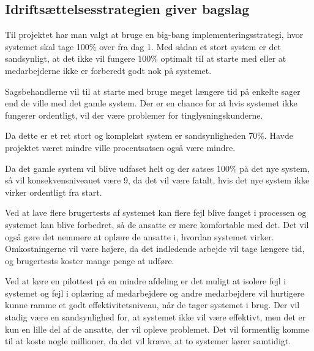 \documentclass[10pt,a4paper,danish]{article}
\begin{document}






\subsection{Idriftsættelsesstrategien giver bagslag}
Til projektet har man valgt at bruge en big-bang implementeringsstrategi, hvor systemet skal tage 100\% over fra dag 1.
Med sådan et stort system er det sandsynligt, at det ikke vil fungere 100\% optimalt til at starte med eller at medarbejderne ikke er forberedt godt nok på systemet. 

Sagsbehandlerne vil til at starte med bruge meget længere tid på enkelte sager end de ville med det gamle system. Der er en chance for at hvis systemet ikke fungerer ordentligt, vil der være problemer for tinglysningskunderne.

Da dette er et ret stort og komplekst system er sandsynligheden 70\%. Havde projektet været mindre ville procentsatsen også være mindre.

Da det gamle system vil blive udfaset helt og der satses 100\% på det nye system, så vil konsekvensniveauet være 9, da det vil være fatalt, hvis det nye system ikke virker ordentligt fra start.

Ved at lave flere brugertests af systemet kan flere fejl blive fanget i processen og systemet kan blive forbedret, så de ansatte er mere komfortable med det. Det vil også gøre det nemmere at oplære de ansatte i, hvordan systemet virker. Omkostningerne vil være højere, da det indledende arbejde vil tage længere tid, og brugertests koster mange penge at udføre.

Ved at køre en pilottest på en mindre afdeling er det muligt at isolere fejl i systemet og fejl i oplæring af medarbejdere og andre medarbejdere vil hurtigere kunne ramme et godt effektivitetsniveau, når de tager systemet i brug.
Der vil stadig være en sandsynlighed for, at systemet ikke vil være effektivt, men det er kun en lille del af de ansatte, der vil opleve problemet. Det vil formentlig komme til at koste nogle millioner, da det vil kræve, at to systemer kører samtidigt.
\end{document}
